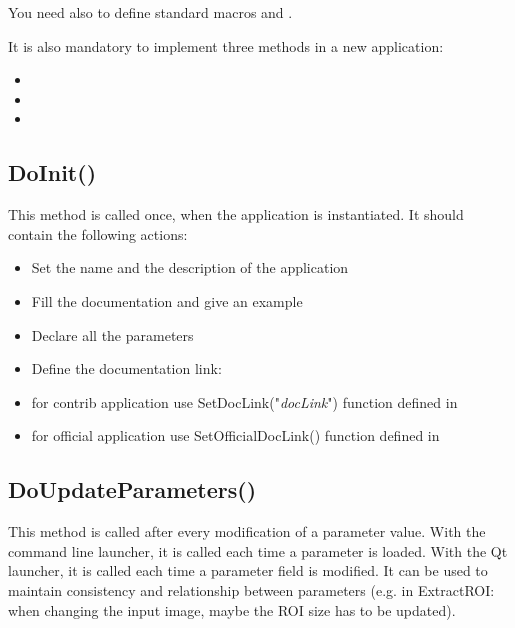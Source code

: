 You need also to define standard macros  and
.
 
It is also mandatory to implement three methods in a new application:
\begin{itemize}
  \item {}
  \item {}
  \item {}
\end{itemize}

\subsection{DoInit()}
\label{sec:appDoInit}
This method is called once, when the application is instantiated. It should 
contain the following actions:
\begin{itemize}
  \item Set the name and the description of the application
  \item Fill the documentation and give an example
  \item Declare all the parameters
  \item Define the documentation link:
    \item for contrib application use SetDocLink("\textit{docLink}") function defined in 
    \item for official application use SetOfficialDocLink() function defined in 
\end{itemize}


\subsection{DoUpdateParameters()}
\label{sec:appDoUpdateParameters}
This method is called after every modification of a parameter value. With the command 
line launcher, it is called each time a parameter is loaded. With the Qt launcher, it
is called each time a parameter field is modified. It can be used to maintain consistency and relationship
between parameters (e.g. in ExtractROI: when changing the input image, maybe the ROI size 
has to be updated).

